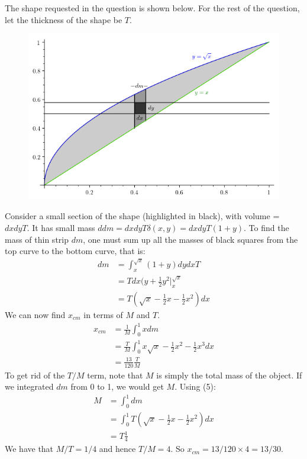 \documentclass{article}
\begin{document}
\begin{enumerate}[label=\alph*)]
    The shape requested in the question is shown below. For the rest of the question, let the thickness of the shape be $T$.
    \begin{figure}[H]
        \includegraphics[width=15cm]{qn6.png}
        \centering
    \end{figure}
    Consider a small section of the shape (highlighted in black), with volume = $dx dy T$. It has small mass $ddm=dx dy T \delta(x,y) = dx dy T (1+y)$. To find the mass of thin strip $dm$, one must sum up all the masses of black squares from the top curve to the bottom curve, that is:
    \begin{align}
        dm &= \int^{\sqrt x}_x (1+y) dy dx T \nonumber \\
        &= T dx (y+\frac{1}{2}y^2 \big|^{\sqrt x}_x \nonumber \\
        &= T (\sqrt{x}-\frac{1}{2}x-\frac{1}{2}x^2) dx
    \end{align}
    We can now find $x_{cm}$ in terms of $M$ and $T$.
    \begin{align*}
        x_{cm} &= \frac{1}{M}\int^1_0 x dm \\
        &=\frac{T}{M} \int^1_0 x\sqrt{x} -\frac{1}{2}x^2-\frac{1}{2}x^3 dx \\
        &= \frac{13}{120} \frac{T}{M}
    \end{align*}
    To get rid of the $T/M$ term, note that $M$ is simply the total mass of the object. If we integrated $dm$ from 0 to 1, we would get $M$. Using (5):
    \begin{align*}
        M&=\int^1_0 dm \\
        &=\int^1_0 T (\sqrt{x}-\frac{1}{2}x-\frac{1}{2}x^2) dx \\
        &=T\frac{1}{4}
    \end{align*}
    We have that $M/T=1/4$ and hence $T/M=4$. So $x_{cm} = 13/120 \times 4 = 13/30$.
    

\end{enumerate}
\end{document}
